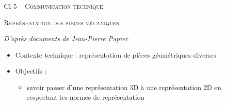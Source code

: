 \documentclass[11pt,oneside]{article}
\begin{document}
\pagestyle{fancy}
\renewcommand{\headrulewidth}{0pt}

\fancyhead{}

\fancyhead[C]{\rule{11cm}{.5pt}}


\renewcommand{\footrulewidth}{0.2pt}

\fancyfoot[C]{\footnotesize{\bfseries \thepage}}




\begin{center}
 \huge\textsc{CI 5 -- Communication technique}
\end{center}

\begin{center}
 \LARGE\textsc{Représentation des pièces mécaniques}
\end{center}



\vspace{.5cm}

\textit{D'après documents de Jean-Pierre Pupier}

\begin{contexte}
\begin{itemize}
\item Contexte technique : représentation de pièces géométriques diverses
\item Objectifs : 
\begin{itemize}
\item savoir passer d'une représentation 3D à une représentation 2D en respectant les normes de représentation
\end{itemize}
\end{itemize}
\end{contexte}
\end{document}
